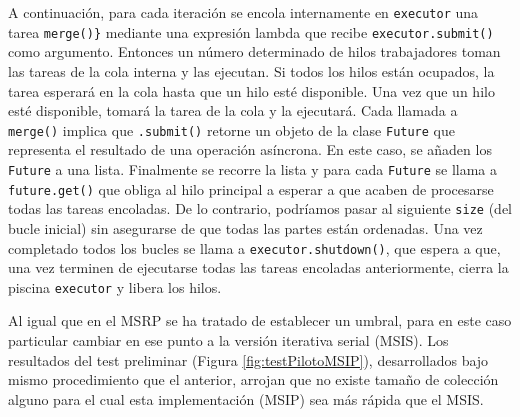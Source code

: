 \documentclass[titlepage]{article}
\begin{document}
A continuación, para cada iteración se encola internamente en \lstinline|executor| una tarea \lstinline|merge()}| mediante una expresión lambda que recibe \lstinline|executor.submit()| como argumento. Entonces un número determinado de hilos trabajadores toman las tareas de la cola interna y las ejecutan. Si todos los hilos están ocupados, la tarea esperará en la cola hasta que un hilo esté disponible. Una vez que un hilo esté disponible, tomará la tarea de la cola y la ejecutará. Cada llamada a \lstinline|merge()| implica que \lstinline|.submit()| retorne un objeto de la clase \lstinline|Future| que representa el resultado de una operación asíncrona. En este caso, se añaden los \lstinline|Future| a una lista. Finalmente se recorre la lista y para cada \lstinline|Future| se llama a \lstinline|future.get()| que obliga al hilo principal a esperar a que acaben de procesarse todas las tareas encoladas. De lo contrario, podríamos pasar al siguiente \lstinline|size| (del bucle inicial) sin asegurarse de que todas las partes están ordenadas. Una vez completado todos los bucles se llama a \lstinline|executor.shutdown()|, que espera a que, una vez terminen de ejecutarse todas las tareas encoladas anteriormente, cierra la piscina \lstinline|executor| y libera los hilos.

Al igual que en el MSRP se ha tratado de establecer un umbral, para en este caso particular cambiar en ese punto a la versión iterativa serial (MSIS). Los resultados del test preliminar (Figura \ref{fig:testPilotoMSIP}), desarrollados bajo mismo procedimiento que el anterior, arrojan que no existe tamaño de colección alguno para el cual esta implementación (MSIP) sea más rápida que el MSIS.
\end{document}

